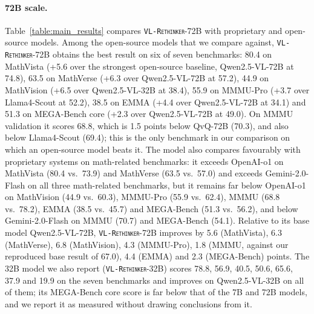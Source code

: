 \documentclass{article}
\newcommand{\model}{\texttt{\textsc{VL-Rethinker}}\xspace}
\begin{document}
\paragraph{72B scale.} Table~\ref{table:main_results} compares \model-72B with proprietary and open-source models. Among the open-source models that we compare against, \model-72B obtains the best result on six of seven benchmarks: 80.4 on MathVista (+5.6 over the strongest open-source baseline, Qwen2.5-VL-72B at 74.8), 63.5 on MathVerse (+6.3 over Qwen2.5-VL-72B at 57.2), 44.9 on MathVision (+6.5 over Qwen2.5-VL-32B at 38.4), 55.9 on MMMU-Pro (+3.7 over Llama4-Scout at 52.2), 38.5 on EMMA (+4.4 over Qwen2.5-VL-72B at 34.1) and 51.3 on MEGA-Bench core (+2.3 over Qwen2.5-VL-72B at 49.0). On MMMU validation it scores 68.8, which is 1.5 points below QvQ-72B (70.3), and also below Llama4-Scout (69.4); this is the only benchmark in our comparison on which an open-source model beats it. The model also compares favourably with proprietary systems on math-related benchmarks: it exceeds OpenAI-o1 on MathVista (80.4 vs.\ 73.9) and MathVerse (63.5 vs.\ 57.0) and exceeds Gemini-2.0-Flash on all three math-related benchmarks, but it remains far below OpenAI-o1 on MathVision (44.9 vs.\ 60.3), MMMU-Pro (55.9 vs.\ 62.4), MMMU (68.8 vs.\ 78.2), EMMA (38.5 vs.\ 45.7) and MEGA-Bench (51.3 vs.\ 56.2), and below Gemini-2.0-Flash on MMMU (70.7) and MEGA-Bench (54.1). Relative to its base model Qwen2.5-VL-72B, \model-72B improves by 5.6 (MathVista), 6.3 (MathVerse), 6.8 (MathVision), 4.3 (MMMU-Pro), 1.8 (MMMU, against our reproduced base result of 67.0), 4.4 (EMMA) and 2.3 (MEGA-Bench) points. The 32B model we also report (\model-32B) scores 78.8, 56.9, 40.5, 50.6, 65.6, 37.9 and 19.9 on the seven benchmarks and improves on Qwen2.5-VL-32B on all of them; its MEGA-Bench core score is far below that of the 7B and 72B models, and we report it as measured without drawing conclusions from it.


\end{document}
